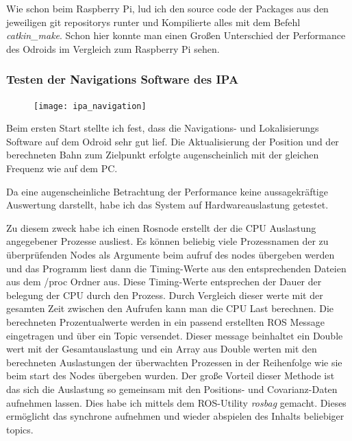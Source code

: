 Wie schon beim Raspberry Pi, lud ich den \Gls{source code} der Packages aus den jeweiligen \Glspl{git repository} runter und Kompilierte alles mit dem Befehl \emph{catkin\_make}. Schon hier konnte man einen Großen Unterschied der Performance des Odroids im Vergleich zum Raspberry Pi sehen.

\subsubsection{Testen der Navigations Software des IPA}

\begin{figure}[ht]
\begin{center}
\texttt{[image: ipa\_navigation]}
  \label{Lokalisierung und Navigation}
\end{center}
\end{figure}

Beim ersten Start stellte ich fest, dass die Navigations- und Lokalisierungs Software auf dem Odroid sehr gut lief. Die Aktualisierung der Position und der berechneten Bahn zum Zielpunkt erfolgte augenscheinlich mit der gleichen Frequenz wie auf dem PC.

Da eine augenscheinliche Betrachtung der Performance keine aussagekräftige Auswertung darstellt, habe ich das System auf Hardwareauslastung getestet. 

Zu diesem zweck habe ich einen Rosnode erstellt der die CPU Auslastung angegebener Prozesse ausliest. Es können beliebig viele Prozessnamen der zu überprüfenden Nodes als Argumente beim aufruf des \Gls{node}s übergeben werden und das Programm liest dann die Timing-Werte aus den entsprechenden Dateien aus dem /proc Ordner aus. Diese Timing-Werte entsprechen der Dauer der belegung der CPU durch den Prozess. Durch Vergleich dieser werte mit der gesamten Zeit zwischen den Aufrufen kann man die CPU Last berechnen. 
Die berechneten Prozentualwerte werden in ein passend erstellten ROS Message eingetragen und über ein Topic versendet. Dieser \Gls{message} beinhaltet ein Double wert mit der Gesamtauslastung und ein Array aus Double werten mit den berechneten Auslastungen der überwachten Prozessen in der Reihenfolge wie sie beim start des Nodes übergeben wurden. Der große Vorteil dieser Methode ist das sich die Auslastung so gemeinsam mit den Positions- und Covarianz-Daten aufnehmen lassen.
Dies habe ich mittels dem ROS-Utility \emph{rosbag} gemacht. Dieses ermöglicht das synchrone aufnehmen und wieder abspielen des Inhalts beliebiger \Glspl{topic}. 

